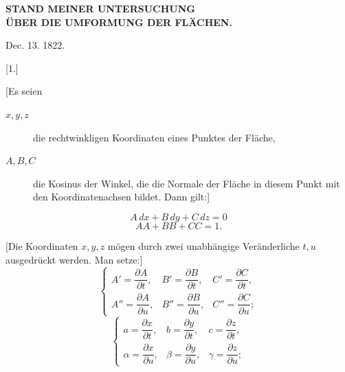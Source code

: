 \clearpage
{}%
\begin{center}\large\bfseries STAND MEINER UNTERSUCHUNG\\ ÜBER DIE UMFORMUNG DER FLÄCHEN.\end{center}
\begin{center}Dec. 13. 1822.\end{center}
\begin{center}[1.]\end{center}

[Es seien
\begin{description}
\item[$x,y,z$] die rechtwinkligen Koordinaten eines Punktes der Fläche,
\item[$A,B,C$] die Kosinus der Winkel, die die Normale der Fläche in diesem Punkt mit den Koordinatenachsen bildet. Dann gilt:]
\end{description}
\begin{equation}\tag*{[1]} A\,dx+B\,dy+C\,dz=0\end{equation}
\begin{equation}\tag*{[2]} AA+BB+CC=1.\end{equation}

[Die Koordinaten $x,y,z$ mögen durch zwei unabhängige Veränderliche $t,u$ ausgedrückt werden. Man setze:]
\begin{equation}\tag*{[3]}
\left\{\begin{array}{lll}
A'=\dfrac{\partial A}{\partial t},&B'=\dfrac{\partial B}{\partial t},&C'=\dfrac{\partial C}{\partial t},\\[6pt]
A''=\dfrac{\partial A}{\partial u},&B''=\dfrac{\partial B}{\partial u},&C''=\dfrac{\partial C}{\partial u};
\end{array}\right.
\end{equation}
\begin{equation}\tag*{[4]}
\left\{\begin{array}{lll}
a=\dfrac{\partial x}{\partial t},&b=\dfrac{\partial y}{\partial t},&c=\dfrac{\partial z}{\partial t},\\[6pt]
\alpha=\dfrac{\partial x}{\partial u},&\beta=\dfrac{\partial y}{\partial u},&\gamma=\dfrac{\partial z}{\partial u};
\end{array}\right.
\end{equation}
